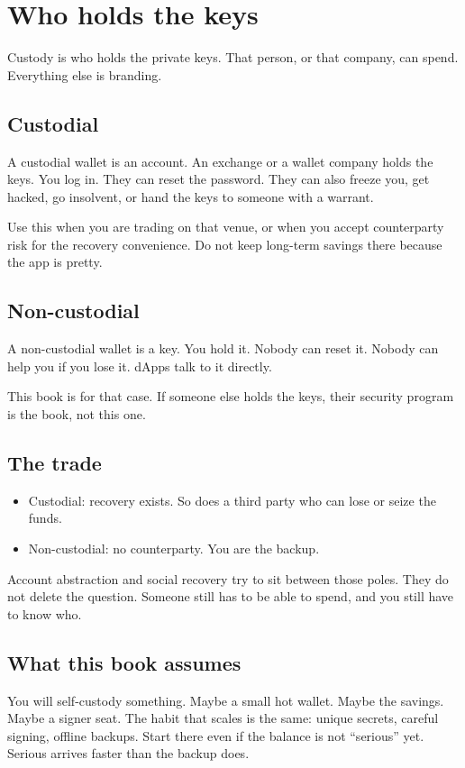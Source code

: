 \chapter{Who holds the keys}

Custody is who holds the private keys. That person, or
that company, can spend. Everything else is branding.

\section{Custodial}

A custodial wallet is an account. An exchange or a
wallet company holds the keys. You log in. They can
reset the password. They can also freeze you, get
hacked, go insolvent, or hand the keys to someone with a
warrant.

Use this when you are trading on that venue, or when you
accept counterparty risk for the recovery convenience.
Do not keep long-term savings there because the app is
pretty.

\section{Non-custodial}

A non-custodial wallet is a key. You hold it. Nobody can
reset it. Nobody can help you if you lose it. dApps
talk to it directly.

This book is for that case. If someone else holds the
keys, their security program is the book, not this one.

\section{The trade}

\begin{itemize}
  \item Custodial: recovery exists. So does a third
  party who can lose or seize the funds.
  \item Non-custodial: no counterparty. You are the
  backup.
\end{itemize}

Account abstraction and social recovery try to sit
between those poles. They do not delete the question.
Someone still has to be able to spend, and you still
have to know who.

\section{What this book assumes}

You will self-custody something. Maybe a small hot
wallet. Maybe the savings. Maybe a signer seat. The
habit that scales is the same: unique secrets, careful
signing, offline backups. Start there even if the
balance is not ``serious'' yet. Serious arrives faster
than the backup does.
